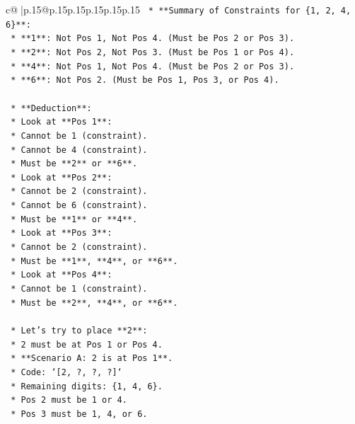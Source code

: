 \documentclass{article}
\begin{document}
{\begin{supertabular}{c@{$\;$}|p{.15\linewidth}@{}p{.15\linewidth}p{.15\linewidth}p{.15\linewidth}p{.15\linewidth}p{.15\linewidth}}
{{{\texttt{    *   **Summary of Constraints for \{1, 2, 4, 6\}**:} \\
\texttt{        *   **1**: Not Pos 1, Not Pos 4. (Must be Pos 2 or Pos 3).} \\
\texttt{        *   **2**: Not Pos 2, Not Pos 3. (Must be Pos 1 or Pos 4).} \\
\texttt{        *   **4**: Not Pos 1, Not Pos 4. (Must be Pos 2 or Pos 3).} \\
\texttt{        *   **6**: Not Pos 2. (Must be Pos 1, Pos 3, or Pos 4).} \\
\\ 
\texttt{    *   **Deduction**:} \\
\texttt{        *   Look at **Pos 1**:} \\
\texttt{            *   Cannot be 1 (constraint).} \\
\texttt{            *   Cannot be 4 (constraint).} \\
\texttt{            *   Must be **2** or **6**.} \\
\texttt{        *   Look at **Pos 2**:} \\
\texttt{            *   Cannot be 2 (constraint).} \\
\texttt{            *   Cannot be 6 (constraint).} \\
\texttt{            *   Must be **1** or **4**.} \\
\texttt{        *   Look at **Pos 3**:} \\
\texttt{            *   Cannot be 2 (constraint).} \\
\texttt{            *   Must be **1**, **4**, or **6**.} \\
\texttt{        *   Look at **Pos 4**:} \\
\texttt{            *   Cannot be 1 (constraint).} \\
\texttt{            *   Must be **2**, **4**, or **6**.} \\
\\ 
\texttt{    *   Let's try to place **2**:} \\
\texttt{        *   2 must be at Pos 1 or Pos 4.} \\
\texttt{        *   **Scenario A: 2 is at Pos 1**.} \\
\texttt{            *   Code: `{[}2, ?, ?, ?{]}`} \\
\texttt{            *   Remaining digits: \{1, 4, 6\}.} \\
\texttt{            *   Pos 2 must be 1 or 4.} \\
\texttt{            *   Pos 3 must be 1, 4, or 6.} \\
}}}
\end{supertabular}}
\end{document}

